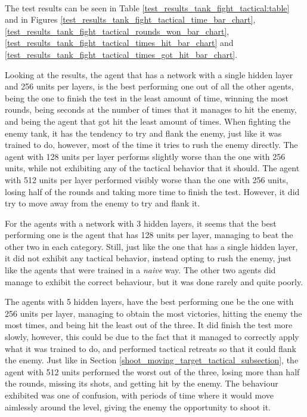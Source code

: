 \paragraph{}
The test results can be seen in Table \ref{test_results_tank_fight_tactical:table} and in Figures \ref{test_results_tank_fight_tactical_time_bar_chart}, \ref{test_results_tank_fight_tactical_rounds_won_bar_chart}, \ref{test_results_tank_fight_tactical_times_hit_bar_chart} and \ref{test_results_tank_fight_tactical_times_got_hit_bar_chart}.

Looking at the results, the agent that has a network with a single hidden layer and 256 units per layers, is the best performing one out of all the other agents, being the one to finish the test in the least amount of time, winning the most rounds, being seconds at the number of times that it manages to hit the enemy, and being the agent that got hit the least amount of times. When fighting the enemy tank, it has the tendency to try and flank the enemy, just like it was trained to do, however, most of the time it tries to rush the enemy directly. The agent with 128 units per layer performs slightly worse than the one with 256 units, while not exhibiting any of the tactical behavior that it should. The agent with 512 units per layer performed visibly worse than the one with 256 units, losing half of the rounds and taking more time to finish the test. However, it did try to move away from the enemy to try and flank it.

For the agents with a network with 3 hidden layers, it seems that the best performing one is the agent that has 128 units per layer, managing to beat the other two in each category. Still, just like the one that has a single hidden layer, it did not exhibit any tactical behavior, instead opting to rush the enemy, just like the agents that were trained in a \emph{naive} way. The other two agents did manage to exhibit the correct behaviour, but it was done rarely and quite poorly.

The agents with 5 hidden layers, have the best performing one be the one with 256 units per layer, managing to obtain the most victories, hitting the enemy the most times, and being hit the least out of the three. It did finish the test more slowly, however, this could be due to the fact that it managed to correctly apply what it was trained to do, and performed tactical retreats so that it could flank the enemy. Just like in Section \ref{shoot_moving_target_tactical_subsection}, the agent with 512 units performed the worst out of the three, losing more than half the rounds, missing its shots, and getting hit by the enemy. The behaviour exhibited was one of confusion, with periods of time where it would move aimlessly around the level, giving the enemy the opportunity to shoot it.

